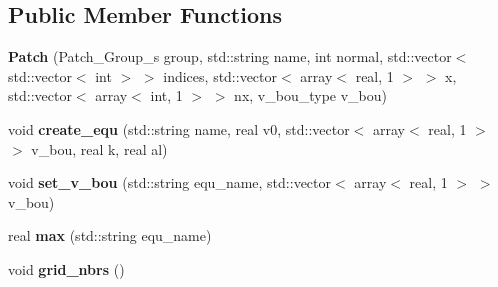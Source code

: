 \subsection*{Public Member Functions}
\begin{DoxyCompactItemize}
\item 
\hypertarget{classPatch_a7adac62309652817919b4e508782566d}{
{\bfseries Patch} (Patch\_\-Group\_\-s group, std::string name, int normal, std::vector$<$ std::vector$<$ int $>$ $>$ indices, std::vector$<$ array$<$ real, 1 $>$ $>$ x, std::vector$<$ array$<$ int, 1 $>$ $>$ nx, v\_\-bou\_\-type v\_\-bou)}
\label{classPatch_a7adac62309652817919b4e508782566d}

\item 
\hypertarget{classPatch_ac8352cc930b37975da9627262540cebd}{
void {\bfseries create\_\-equ} (std::string name, real v0, std::vector$<$ array$<$ real, 1 $>$ $>$ v\_\-bou, real k, real al)}
\label{classPatch_ac8352cc930b37975da9627262540cebd}

\item 
\hypertarget{classPatch_af0311eccfd4f4fd356785f7b23dc8fa2}{
void {\bfseries set\_\-v\_\-bou} (std::string equ\_\-name, std::vector$<$ array$<$ real, 1 $>$ $>$ v\_\-bou)}
\label{classPatch_af0311eccfd4f4fd356785f7b23dc8fa2}

\item 
\hypertarget{classPatch_aa0a6036ed90bf4a98cc498f925fb530d}{
real {\bfseries max} (std::string equ\_\-name)}
\label{classPatch_aa0a6036ed90bf4a98cc498f925fb530d}

\item 
\hypertarget{classPatch_ae57b4223cce6c1ed9dbaaa5080a2501a}{
void {\bfseries grid\_\-nbrs} ()}
\label{classPatch_ae57b4223cce6c1ed9dbaaa5080a2501a}

\end{DoxyCompactItemize}
